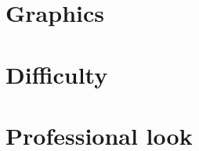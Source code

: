 \documentclass[11pt]{article}
\begin{document}
\section*{Graphics}

\vspace*{0.5in}


\section*{Difficulty}

\vspace*{0.5in}


\section*{Professional look}

\vspace*{0.5in}




\end{document}
